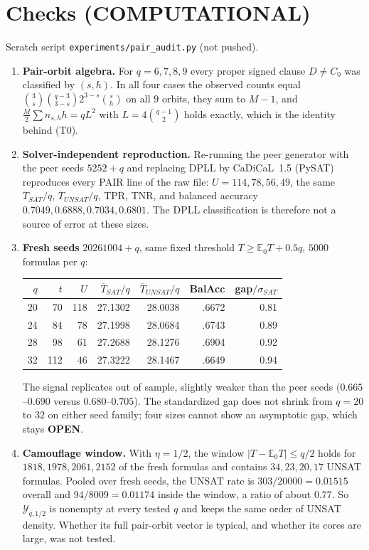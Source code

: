 \documentclass[11pt]{article}
\begin{document}
\section*{Checks (COMPUTATIONAL)}
Scratch script \texttt{experiments/pair\_audit.py} (not pushed).
\begin{enumerate}
\item \textbf{Pair-orbit algebra.} For $q=6,7,8,9$ every proper signed clause $D\neq C_0$ was classified by $(s,h)$. In all four cases the observed counts equal $\binom3s\binom{q-3}{3-s}2^{3-s}\binom sh$ on all $9$ orbits, they sum to $M-1$, and $\tfrac M2\sum n_{s,h}h=qL^2$ with $L=4\binom{q-1}2$ holds exactly, which is the identity behind (T0).
\item \textbf{Solver-independent reproduction.} Re-running the peer generator with the peer seeds $5252+q$ and replacing DPLL by CaDiCaL~1.5 (PySAT) reproduces every PAIR line of the raw file: $U=114,78,56,49$, the same $\overline T_{SAT}/q$, $\overline T_{UNSAT}/q$, TPR, TNR, and balanced accuracy $0.7049,0.6888,0.7034,0.6801$. The DPLL classification is therefore not a source of error at these sizes.
\item \textbf{Fresh seeds} $20261004+q$, same fixed threshold $T\ge\mathbb E_0T+0.5q$, $5000$ formulas per $q$:
\begin{center}
\begin{tabular}{rrrrrrr}
$q$ & $t$ & $U$ & $\overline T_{SAT}/q$ & $\overline T_{UNSAT}/q$ & BalAcc & gap$/\sigma_{SAT}$\\\hline
20 & 70 & 118 & 27.1302 & 28.0038 & .6672 & 0.81\\
24 & 84 & 78 & 27.1998 & 28.0684 & .6743 & 0.89\\
28 & 98 & 61 & 27.2688 & 28.1276 & .6904 & 0.92\\
32 & 112 & 46 & 27.3222 & 28.1467 & .6649 & 0.94
\end{tabular}
\end{center}
The signal replicates out of sample, slightly weaker than the peer seeds ($0.665$--$0.690$ versus $0.680$--$0.705$). The standardized gap does not shrink from $q=20$ to $32$ on either seed family; four sizes cannot show an asymptotic gap, which stays \textbf{OPEN}.
\item \textbf{Camouflage window.} With $\eta=1/2$, the window $|T-\mathbb E_0T|\le q/2$ holds for $1818,1978,2061,2152$ of the fresh formulas and contains $34,23,20,17$ UNSAT formulas. Pooled over fresh seeds, the UNSAT rate is $303/20000=0.01515$ overall and $94/8009=0.01174$ inside the window, a ratio of about $0.77$. So $\mathcal Y_{q,1/2}$ is nonempty at every tested $q$ and keeps the same order of UNSAT density. Whether its full pair-orbit vector is typical, and whether its cores are large, was not tested.
\end{enumerate}
\end{document}
